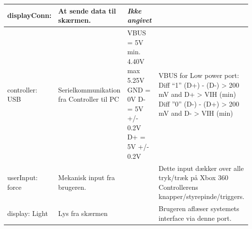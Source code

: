 \begin{table}[h]
\begin{tabularx}{\textwidth}{|l|X|X|X|}
displayConn:
	&   At sende data til skærmen.
	&  \textit{Ikke angivet} 
	&  
	\\ \hline
	
controller: USB
	& Serielkommunikation fra Controller til PC 
	& VBUS = 5V min. 4.40V max 5.25V \newline
		GND = 0V \newline
		D- = 5V +/- 0.2V \newline
		D+ = 5V +/- 0.2V \newline
	& VBUS for Low power port: \newline
		Diff  “1” \newline
		(D+) - (D-) > 200 mV \newline
		and D+ > VIH (min) \newline
		Diff ”0” \newline
		(D-) - (D+) > 200 mV \newline
		and D- > VIH (min)
	\\ \hline
	
userInput: force
	& Mekanisk input fra brugeren.
	& 
	& Dette input dækker over alle tryk/træk på Xbox 360 Controllerens knapper/styrepinde/triggers.
	\\ \hline
	
display: Light
	& Lys fra skærmen
	& 
	& Brugeren aflæser systemets interface via denne port.
	\\ \hline
	\end{tabularx}
\end{table}